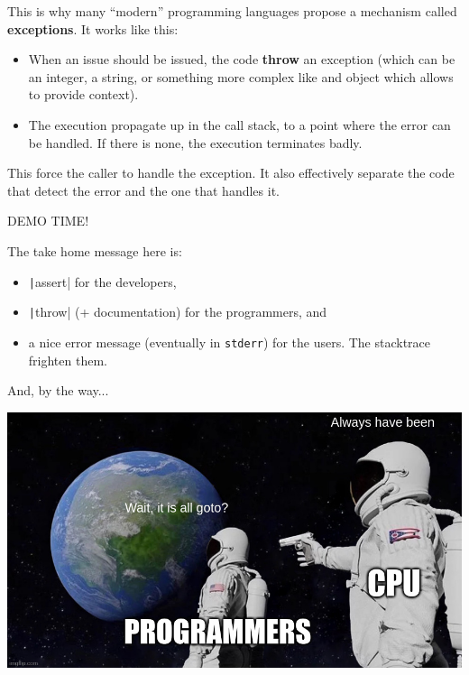\documentclass[10pt,
aspectratio=169
]{beamer}
\begin{document}
\begin{frame}
This is why many ``modern'' programming languages propose a mechanism called \textbf{exceptions}.  It works like this:\begin{itemize}
	\item When an issue should be issued, the code \textbf{throw} an exception (which can be an integer, a string, or something more complex like and object which allows to provide context).
	\item The execution propagate up in the call stack, to a point where the error can be handled. If there is none, the execution terminates badly.
\end{itemize}
This force the caller to handle the exception. It also effectively separate the code that detect the error and the one that handles it.
\end{frame}

\begin{frame}
\begin{center}
	{\LARGE DEMO TIME!}
\end{center}
\end{frame}

\begin{frame}
The take home message here is:\begin{itemize}
	\item \texttt|assert| for the developers,
	\item \texttt|throw| (+ documentation) for the programmers, and
	\item a nice error message (eventually in \texttt{stderr}) for the users. The stacktrace frighten them.
\end{itemize}


And, by the way...

\begin{center}
	\includegraphics[width=.5\linewidth]{im/meme-goto}
\end{center}
\end{frame}
\end{document}
